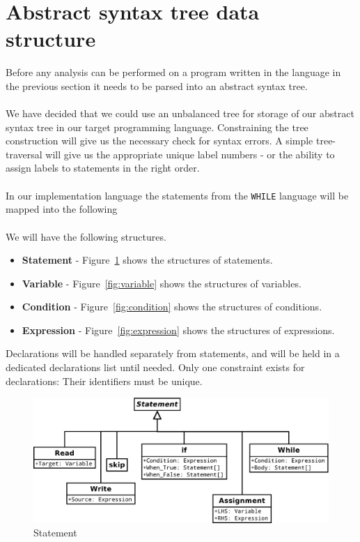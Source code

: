 \section{Abstract syntax tree data structure}\label{section:Abstractsyntaxtreedatastructure}
\label{sec:constructing_ast}
Before any analysis can be performed on a program written in the language in the previous section it needs to be parsed into an abstract syntax tree.\\\\
We have decided that we could use an unbalanced tree for storage of our abstract syntax tree in our target programming language. Constraining the tree construction will give us the necessary check for syntax errors.
A simple tree-traversal will give us the appropriate unique label numbers - or the ability to assign labels to statements in the right order.
\\
\\
In our implementation language the statements from the \texttt{WHILE} language will be mapped into the following  
\\\\
We will have the following structures.
\begin{itemize}
	\item \textbf{Statement} - Figure~\ref{fig:statement} shows the structures of statements.
	\item \textbf{Variable} - Figure~\ref{fig:variable} shows the structures of variables.
	\item \textbf{Condition} - Figure~\ref{fig:condition} shows the structures of conditions.
	\item \textbf{Expression} - Figure~\ref{fig:expression} shows the structures of expressions.
\end{itemize}
Declarations will be handled separately from statements, and will be held in a dedicated declarations list until needed. Only one constraint exists for declarations: Their identifiers must be unique.

\begin{figure}[h]
	\centering
	\includegraphics[scale=0.5]{../fig/Statement}
	\caption{Statement}
	\label{fig:statement}
\end{figure}


